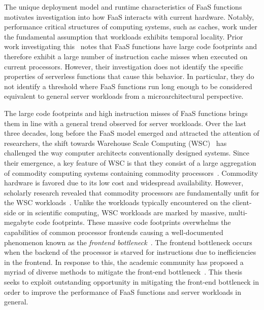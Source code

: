 \documentclass[../main.tex]{subfiles}
\begin{document}
\begin{refsection}
The unique deployment model and runtime characteristics of FaaS
functions motivates investigation into how FaaS interacts with current
hardware. Notably, performance critical structures of computing
systems, such as caches, work under the fundamental assumption that
workloads exhibits temporal locality. Prior work investigating
this~\cite{lukewarm_serverless} notes that FaaS functions have large
code footprints and therefore exhibit a large number of instruction
cache misses when executed on current processors. However, their
investigation does not identify the specific properties of serverless
functions that cause this behavior. In particular, they do not
identify a threshold where FaaS functions run long enough to be
considered equivalent to general server workloads from a
microarchitectural perspective.

The large code footprints and high instruction misses of FaaS
functions brings them in line with a general trend observed for server
workloads. Over the last three decades, long before the FaaS model
emerged and attracted the attention of researchers, the shift towards
Warehouse Scale Computing (WSC)~\cite{barroso18_datac_as_comput} has
challenged the way computer architects conventionally designed
systems. Since their emergence, a key feature of WSC is that they
consist of a large aggregation of commodity computing systems
containing commodity
processors~\cite{barroso03_web_searc_planet}. Commodity hardware is
favored due to its low cost and widespread availability. However,
scholarly research revealed that commodity processors are
fundamentally unfit for the WSC
workloads~\cite{ferdman12_clear_cloud,kanev15_profil}. Unlike the
workloads typically encountered on the client-side or in scientific
computing, WSC workloads are marked by massive, multi-megabyte code
footprints. These massive code footprints overwhelms the capabilities
of common processor frontends causing a well-documented phenomenon
known as the \emph{frontend
  bottleneck}~\cite{ailamaki99_dbmss_moder_proces,keeton98_perfor_charac_quad_pentium_pro,ranganathan98_perfor_datab_workl_shared_memor}. The
frontend bottleneck occurs when the backend of the processor is
starved for instructions due to inefficiencies in the frontend. In
response to this, the academic community has proposed a myriad of
diverse methods to mitigate the front-end
bottleneck~\cite{reinman99_fetch_direc_instr_prefet,kumar17_boomer,kumar18_blast_throug_front_end_bottl_with_shotg,kumar20_shoot_down_server_front_end_bottl,ferdman08_tempor,ferdman11_proac_instr_fetch,kaynak13_shift,kaynak15_confl,ayers19_asmdb,ajorpaz18_explor_predic_replac_polic_instr,khan20_i_spy,soundararajan21_pdede,ansari20_divid,khan21_rippl,}.
This thesis seeks to exploit outstanding opportunity in mitigating
the front-end bottleneck in order to improve the performance of FaaS
functions and server workloads in general.




\end{refsection}
\end{document}
